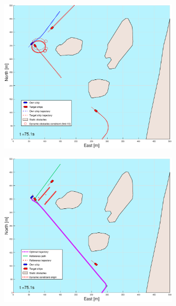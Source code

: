 \begin{figure}[!b]
\begin{subfigure}[b]{0.499\textwidth}
    \end{subfigure}
    \hfill
    \\
    \begin{subfigure}[b]{0.49\textwidth}
        \centering
        \includegraphics[width=\textwidth]{Images/Figures/Helloya_Rev/_Simple_0fig1_time=75}
    \end{subfigure}
    \hfill
    \begin{subfigure}[b]{0.499\textwidth}
        \centering
        \includegraphics[width=\textwidth]{Images/Figures/Helloya_Rev/_Simple_0fig999_time=75}
    \end{subfigure}
    \hfill
\end{figure}%
